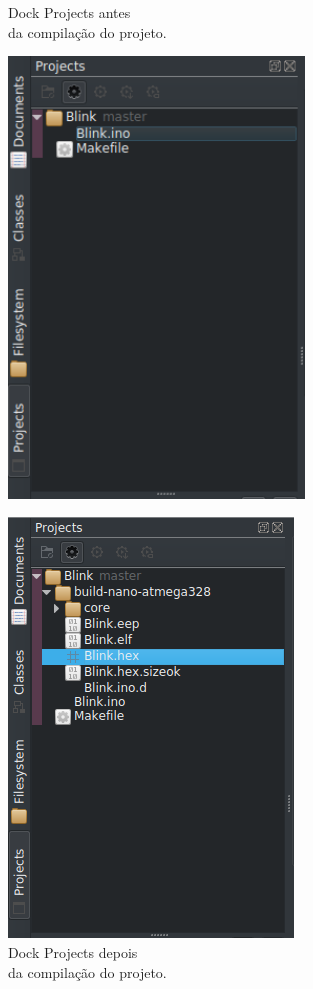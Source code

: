 \begin{figure}[!htb]
  \begin{minipage}[t]{0.5\textwidth}
  \caption[Projects antes da compilação]{Dock Projects antes\\ da compilação do projeto.}
  \label{fig:projects}
  \includegraphics[width=0.7\textwidth]{figuras/projects.png}
  \end{minipage}%
  \begin{minipage}[t]{0.5\textwidth}
  \caption[Projects depois da compilação]{Dock Projects depois\\ da compilação do projeto.}
  \includegraphics[width=0.713\linewidth]{figuras/projects2.png}

\end{minipage}
\end{figure}
